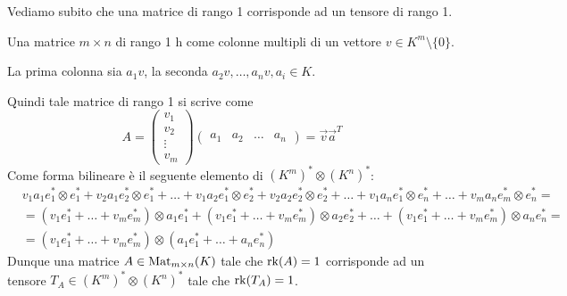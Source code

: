 \documentclass[../main.tex]{subfiles}
\begin{document}
Vediamo subito che una matrice di rango 1 corrisponde ad un tensore di rango 1.

Una matrice $m \times n$ di rango 1 h come colonne multipli di un vettore $v \in K^m \setminus \{0\}$.

La prima colonna sia $a_1v$, la seconda $a_2v, \ldots , a_nv, a_i \in K$.

Quindi tale matrice di rango 1 si scrive come
\begin{equation*}
    A = \begin{pmatrix}
        v_1    \\
        v_2    \\
        \vdots \\
        v_m
    \end{pmatrix}
    \begin{pmatrix}
        a_1 & a_2 & \ldots & a_n
    \end{pmatrix} = \overrightarrow{v} \overrightarrow{a}^T
\end{equation*}
Come forma bilineare è il seguente elemento di $(K^m)^* \otimes (K^n)^*$:
\begin{align*}
     & v_1 a_1 e_1^* \otimes e_1^* + v_2 a_1 e_2^* \otimes e_1^* + \ldots + v_1 a_2 e_1^* \otimes e_2^* + v_2 a_2 e_2^* \otimes e_2^* + \ldots + v_1 a_n e_1^* \otimes e_n^* + \ldots + v_m a_n e_m^* \otimes e_n^* = \\
     & = (v_1 e_1^* + \ldots + v_m e_m^*) \otimes a_1 e_1^* + (v_1 e_1^* + \ldots +v_m e_m^*) \otimes a_2 e_2^* + \ldots +(v_1 e_1^* + \ldots + v_m e_m^*) \otimes a_n e_n^* =                                        \\
     & = (v_1 e_1^* + \ldots + v_m e_m^*) \otimes (a_1 e_1^* + \ldots + a_n e_n^*)
\end{align*}
Dunque una matrice $A \in \operatorname{Mat}_{m \times n} (K)$ tale che $\operatorname{rk}(A) = 1$ corrisponde ad un tensore $T_A \in (K^m)^* \otimes (K^n)^*$ tale che $\operatorname{rk}(T_A) = 1$.
\end{document}
